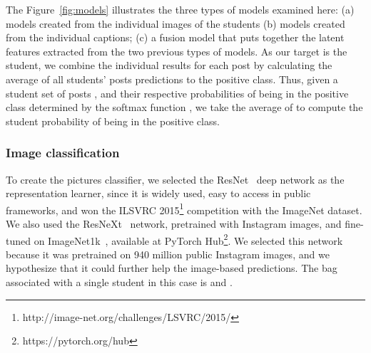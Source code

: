 \documentclass[letterpaper]{article} \usepackage{aaai20}  \usepackage{times}  \usepackage{helvet} \usepackage{courier}  \usepackage[hyphens]{url}  \usepackage{graphicx} \urlstyle{rm} \def\UrlFont{\rm}  \usepackage{graphicx}  \frenchspacing  \setlength{\pdfpagewidth}{8.5in}  \setlength{\pdfpageheight}{11in}  \usepackage[final]{changes}
\begin{document}
The Figure~\ref{fig:models} illustrates the three types of models examined here: (a) models created from the individual images of the students (b) models created from the individual captions; (c) a fusion model that puts together the latent features extracted from the two previous types of models. As our target is the student, we combine the individual results for each post by calculating the average of all students' posts predictions to the positive class. Thus, given a student  set of posts , and their respective probabilities of being in the positive class determined by the softmax function , we take the average of  to compute the student probability of being in the positive class.

\subsubsection{Image classification} To create the pictures classifier, we selected the ResNet~\cite{he2016deep} deep network as the representation learner, since it is widely used, easy to access in public frameworks, and won the ILSVRC 2015\footnote{http://image-net.org/challenges/LSVRC/2015/} competition with the ImageNet dataset. We also used the ResNeXt~\cite{xie2017aggregated} network, pretrained with Instagram images, and fine-tuned on ImageNet1k~\cite{mahajan2018exploring}, available at PyTorch Hub\footnote{https://pytorch.org/hub}. We selected this network because it was pretrained on 940 million public Instagram images, and we hypothesize that it could further help the image-based predictions. The bag associated with a single student in this case is  and . 
\end{document}

